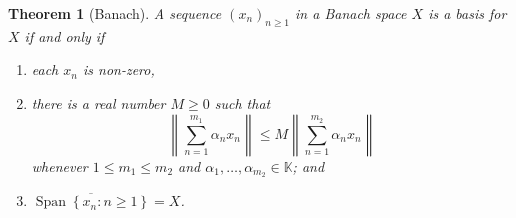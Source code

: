 \documentclass[11pt]{article}
\theoremstyle{thmstyle}
\newtheorem{theorem}{Theorem}[section]
\theoremstyle{defstyle}
\newcommand{\R}{\mathbb{R}}
\newcommand{\bbC}{\mathbb{C}}
\newcommand{\K}{\mathbb{K}} %
\newcommand{\Span}{\operatorname{Span}}
\renewcommand{\le}{\leqslant}
\renewcommand{\ge}{\geqslant}
\begin{document}
\begin{theorem}[Banach]
	A sequence $(x_n)_{n\ge 1}$ in a Banach space $X$ is a basis for $X$ if and only if 
	\begin{enumerate}[label=(\roman*)]
		\item each $x_n$ is non-zero, 
		\item there is a real number $M\ge 0$ such that 
		\begin{equation*}
			\left\|\sum_{n = 1}^{m_1}\alpha_n x_n\right\|\le M\left\|\sum_{n = 1}^{m_2} \alpha_n x_n\right\|
		\end{equation*}
		whenever $1\le m_1\le m_2$ and $\alpha_1,\dots,\alpha_{m_2}\in\K$; and 
		\item $\overline{\Span\left\{x_n\colon n\ge 1\right\}} = X$.
	\end{enumerate}
\end{theorem}
\end{document}
